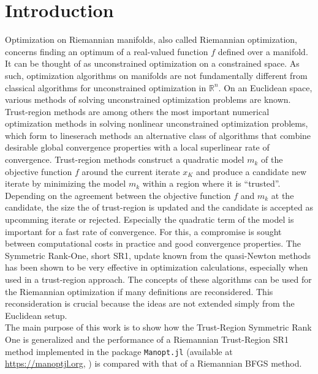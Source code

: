 \chapter{Introduction}

Optimization on Riemannian manifolds, also called Riemannian optimization, concerns finding an optimum of a real-valued function $f$ defined over a manifold. It can be thought of as unconstrained optimization on a constrained space. As such, optimization algorithms on manifolds are not fundamentally different from classical algorithms for unconstrained optimization in $\mathbb{R}^n$. On an Euclidean space, various methods of solving unconstrained optimization problems are known. \\
Trust-region methods are among others the most important numerical optimization methods in solving nonlinear unconstrained optimization problems, which form to lineserach methods an alternative class of algorithms that combine desirable global convergence properties with a local superlinear rate of convergence. Trust-region methods construct a quadratic model $m_k$ of the objective function $f$ around the current iterate $x_K$ and produce a candidate new iterate by minimizing the model $m_k$ within a region where it is “trusted”. Depending on the agreement between the objective function $f$ and $m_k$ at the candidate, the size the of trust-region is updated and the candidate is accepted as upcomming iterate or rejected. Especially the quadratic term of the model is important for a fast rate of convergence. For this, a compromise is sought between computational costs in practice and good convergence properties. The Symmetric Rank-One, short SR1, update known from the quasi-Newton methods has been shown to be very effective in optimization calculations, especially when used in a trust-region approach. The concepts of these algorithms can be used for the Riemannian optimization if many definitions are reconsidered. This reconsideration is crucial because the ideas are not extended simply from the Euclidean setup. \\
The main purpose of this work is to show how the Trust-Region Symmetric Rank One is generalized and the performance of a Riemannian Trust-Region SR1 method implemented in the package \lstinline!Manopt.jl! (available at \url{https://manoptjl.org}, \cite{Bergmann:2019}) is compared with that of a Riemannian BFGS method.
